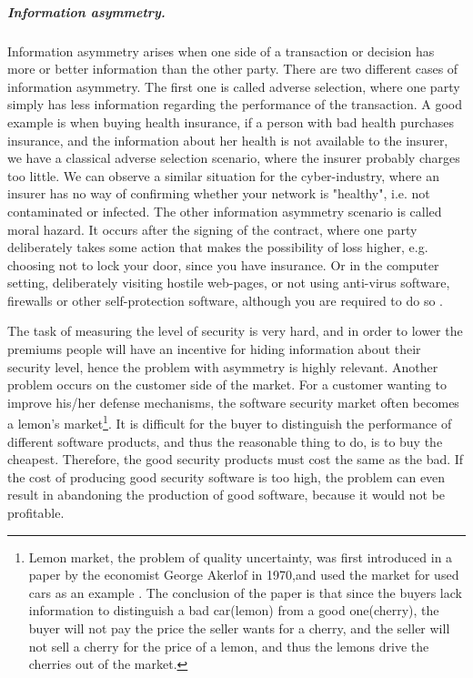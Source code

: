 \subparagraph{Information asymmetry.}
Information asymmetry arises when one side of a transaction or decision has more or better information than the other party. There are two different cases of information asymmetry. The first one is called adverse selection, where one party simply has less information regarding the performance of the transaction. A good example is when buying health insurance, if a person with bad health purchases insurance, and the information about her health is not available to the insurer, we have a classical adverse selection scenario, where the insurer probably charges too little. We can observe a similar situation for the cyber-industry, where an insurer has no way of confirming whether your network is "healthy", i.e. not contaminated or infected. 
The other information asymmetry scenario is called moral hazard. It occurs after the signing of the contract, where one party deliberately takes some action that makes the possibility of loss higher, e.g. choosing not to lock your door, since you have insurance. Or in the computer setting, deliberately visiting hostile web-pages, or not using anti-virus software, firewalls or other self-protection software, although you are required to do so \cite{solutiontoinfoasym}.
    
    
The task of measuring the level of security is very hard, and in order to lower the premiums people will have an incentive for hiding information about their security level, hence the problem with asymmetry is highly relevant. Another problem occurs on the customer side of the market. For a customer wanting to improve his/her defense mechanisms, the software security market often becomes a lemon's market\footnote{Lemon market, the problem of quality uncertainty, was first introduced in a paper \cite{lemonpaper} by the economist George Akerlof in 1970,and used the market for used cars as an example \cite{lemon}. The conclusion of the paper is that since the buyers lack information to distinguish a bad car(lemon) from a good one(cherry), the buyer will not pay the price the seller wants for a cherry, and the seller will not sell a cherry for the price of a lemon, and thus the lemons drive the cherries out of the market.}. 
It is difficult for the buyer to distinguish the performance of different software products, and thus the reasonable thing to do, is to buy the cheapest. Therefore, the good security products must cost the same as the bad. If the cost of producing good security software is too high, the problem can even result in abandoning the production of good software, because it would not be profitable.

